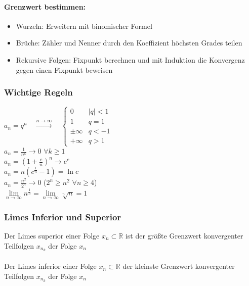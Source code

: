 \documentclass[6pt,a4paper]{scrartcl}
\newcommand{\ra}[0]{\ensuremath{\rightarrow}}
\begin{document}
\begin{multicols*}{4}
\paragraph{Grenzwert bestimmen:}
\begin{itemize}\itemsep0pt
\item Wurzeln: Erweitern mit binomischer Formel
\item Brüche: Zähler und Nenner durch den Koeffizient höchsten Grades teilen
\item Rekursive Folgen: Fixpunkt berechnen und mit Induktion die Konvergenz gegen einen Fixpunkt beweisen 
\end{itemize}

\subsubsection{Wichtige Regeln}
$a_n=q^n \quad \overset{n \rightarrow \infty}{\longrightarrow} \quad \begin{cases} 0 & |q|<1 \\ 1 & q=1 \\ \pm \infty & q < -1  \\  + \infty & q > 1\end{cases}$ \\
$a_n=\frac{1}{n^k}\rightarrow 0$ \qquad $\forall k \ge 1$\\ 
$a_n=\left(1+\frac{c}{n}\right)^n \rightarrow e^c$ \\
$a_n=n\left(c^{\frac1{n}}-1\right) = \ln c$\\
$a_n=\frac{n^2}{2^n}\ra 0$ \qquad \qquad \qquad ($2^n \ge n^2$ \quad $\forall n\ge 4$) \\
$\lim\limits_{n\to\infty}n^{\frac{1}{n}}=\lim\limits_{n\to\infty}\sqrt[n]{n}=1$


\subsubsection{Limes Inferior und Superior}
Der Limes superior einer Folge $x_n \subset \mathbb{R}$ ist der größte Grenzwert konvergenter Teilfolgen $x_{n_k}$ der Folge ${x_n}$ \\ \\
Der Limes inferior einer Folge $x_n \subset \mathbb{R}$ der kleinste Grenzwert konvergenter Teilfolgen $x_{n_k}$ der Folge $x_n$



\end{multicols*}
\end{document}
